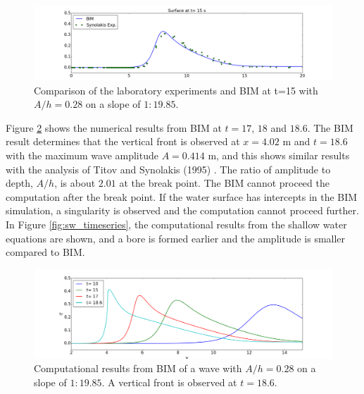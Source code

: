 \documentclass[review]{elsarticle}
\begin{document}
\begin{figure}[!htb]
\centering
\includegraphics[width=\textwidth]{_fig/lab_bim_t15.png}
\caption{Comparison of the laboratory experiments and BIM at t=15 with $A/h=0.28$ 
on a slope of $1:19.85$.}
\label{fig:lab_bim}
\end{figure}

Figure \ref{fig:bim_breaking} shows
the numerical results from BIM at $t=17$, $18$ and  $18.6$.
The BIM result determines that 
the vertical front is observed at $x=4.02$ m and $t=18.6$
with the maximum wave amplitude $A=0.414$ m,
and this shows similar results with 
the analysis of Titov and Synolakis (1995) \cite{titov1995modeling}. 
The ratio of amplitude to depth, $A/h$, 
is about $2.01$ at the break point.
The BIM cannot proceed the computation after the break point.
If the water surface has intercepts in the BIM simulation,
a singularity is observed and the computation cannot
proceed further.
In Figure \ref{fig:sw_timeseries}, 
the computational results from the shallow water equations are shown,
and a bore is formed earlier and the amplitude is smaller
compared to BIM.

\begin{figure}[!htb]
\centering
\includegraphics[width=\textwidth]{_fig/bim_n7_time_series.png}
\caption{Computational results from BIM of a wave with $A/h=0.28$ 
on a slope of $1:19.85$.
A vertical front is observed at $t=18.6$. }
\label{fig:bim_breaking}
\end{figure}


\end{document}

